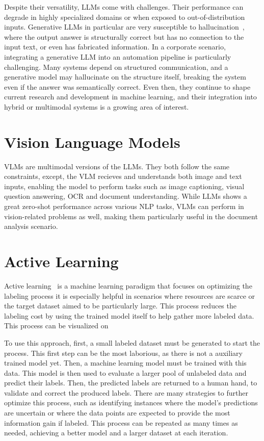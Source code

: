 Despite their versatility, LLMs come with challenges. Their performance can degrade in highly specialized domains or when exposed to out-of-distribution inputs. Generative LLMs in particular are very susceptible to hallucination~\cite{ji_survey_2023}, where the output answer is structurally correct but has no connection to the input text, or even has fabricated information. In a corporate scenario, integrating a generative LLM into an automation pipeline is particularly challenging. Many systems depend on structured communication, and a generative model may hallucinate on the structure itself, breaking the system even if the answer was semantically correct. Even then, they continue to shape current research and development in machine learning, and their integration into hybrid or multimodal systems is a growing area of interest.

\section{Vision Language Models}

\glspl{VLM} are multimodal versions of the \glspl{LLM}. They both follow the same constraints, except, the \gls{VLM} recieves and understands both image and text inputs, enabling the model to perform tasks such as image captioning, visual question answering, \gls{OCR} and document understanding. While \glspl{LLM} shows a great zero-shot performance across various \gls{NLP} tasks, \glspl{VLM} can perform in vision-related problems as well, making them particularly useful in the document analysis scenario.

\section{Active Learning}
\label{sec:active_learning}

Active learning~\cite{settles_active_2009} is a machine learning paradigm that focuses on optimizing the labeling process it is especially helpful in scenarios where resources are scarce or the target dataset aimed to be particularly large. This process reduces the labeling cost by using the trained model itself to help gather more labeled data. This process can be visualized on 

To use this approach, first, a small labeled dataset must be generated to start the process. This first step can be the most laborious, as there is not a auxiliary trained model yet. Then, a machine learning model must be trained with this data. This model is then used to evaluate a larger pool of unlabeled data and predict their labels. Then, the predicted labels are returned to a human hand, to validate and correct the produced labels. There are many strategies to further optimize this process, such as identifying instances where the model's predictions are uncertain or where the data points are expected to provide the most information gain if labeled. This process can be repeated as many times as needed, achieving a better model and a larger dataset at each iteration.

